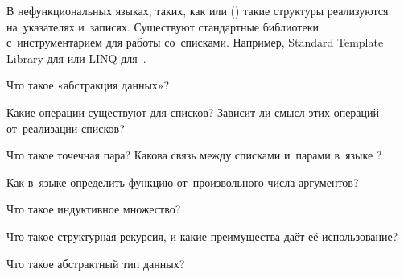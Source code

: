 В нефункциональных языках, таких, как  или  () такие структуры реализуются на~указателях и~записях. Существуют стандартные библиотеки с~инструментарием для работы со~списками. Например, Standard Template Library для  или LINQ для~.

\begin{Queeze}

 \item Что такое «абстракция данных»?

 \item Какие операции существуют для списков? Зависит ли смысл этих операций от~реализации списков?

 \item Что такое точечная пара? Какова связь между списками и~парами в~языке \Scheme?

 \item Как в~языке \Scheme определить функцию от~произвольного числа аргументов?

 \item Что такое индуктивное множество?

 \item Что такое структурная рекурсия, и какие преимущества даёт её использование?
 
 \item Что такое абстрактный тип данных?


\end{Queeze}
\endinput